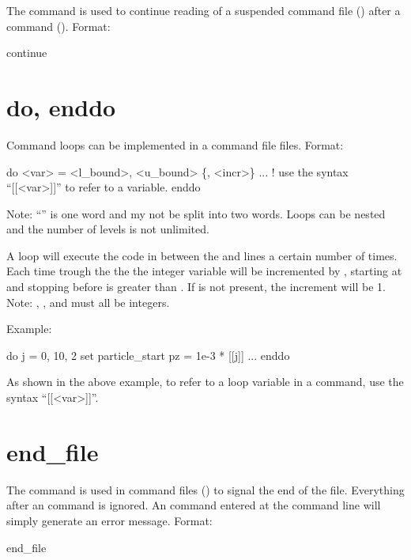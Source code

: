 The  command is used to continue reading of a suspended command file
() after a  command (). Format:
\begin{example}
  continue
\end{example}

\section{do, enddo}
\label{s:do}

Command loops can be implemented in a command file files. Format:
\begin{example}
  do <var> = <l_bound>, <u_bound> \{, <incr>\}
    ...   ! use the syntax ``[[<var>]]'' to refer to a variable.
  enddo
\end{example}
Note: ``'' is one word and my not be split into two words.
Loops can be nested and the number of levels is not unlimited. 

A loop will execute the code in between the  and  lines a certain number of
times. Each time trough the the the integer variable  will be incremented by ,
starting at  and stopping before  is greater than . If
 is not present, the increment will be 1. Note: , , and
 must all be integers.

Example:
\begin{example}
  do j = 0, 10, 2
    set particle_start pz = 1e-3 * [[j]]
    ...
  enddo
\end{example}
As shown in the above example, to refer to a loop variable in a command, use the syntax ``[[<var>]]''.

\section{end_file} \label{s:end.file}

The  command is used in command files () to signal the
end of the file. Everything after an  command is ignored. An 
command entered at the command line will simply generate an error message.  Format:
\begin{example}
  end_file
\end{example}

